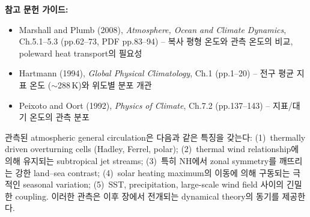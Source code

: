 \begin{hisublock}
\textbf{참고 문헌 가이드:}
\begin{itemize}
  \item Marshall and Plumb (2008), \textit{Atmosphere, Ocean and Climate Dynamics}, Ch.5.1--5.3 (pp.62--73, PDF pp.83--94) -- 복사 평형 온도와 관측 온도의 비교, poleward heat transport의 필요성
  \item Hartmann (1994), \textit{Global Physical Climatology}, Ch.1 (pp.1--20) -- 전구 평균 지표 온도 ($\sim$288\,K)와 위도별 분포 개관
  \item Peixoto and Oort (1992), \textit{Physics of Climate}, Ch.7.2 (pp.137--143) -- 지표/대기 온도의 관측 분포
\end{itemize}
\end{hisublock}


\vspace{12pt}
\begin{highlight}
관측된 atmospheric general circulation은 다음과 같은 특징을 갖는다:
(1)~thermally driven overturning cells (Hadley, Ferrel, polar);
(2)~thermal wind relationship에 의해 유지되는 subtropical jet streams;
(3)~특히 NH에서 zonal symmetry를 깨뜨리는 강한 land--sea contrast;
(4)~solar heating maximum의 이동에 의해 구동되는 극적인 seasonal variation;
(5)~SST, precipitation, large-scale wind field 사이의 긴밀한 coupling.
이러한 관측은 이후 장에서 전개되는 dynamical theory의 동기를 제공한다.
\end{highlight}
